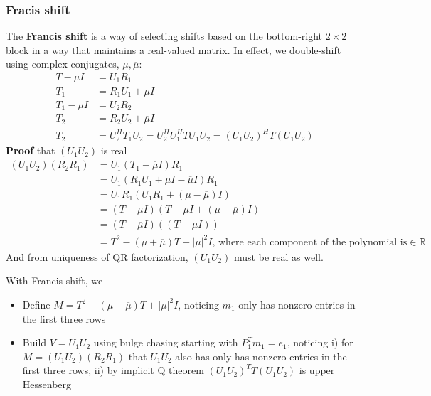 \documentclass{article}
\newcommand{\abs}[1]{\lvert#1\rvert}
\begin{document}
\subsubsection{Fracis shift}
The \textbf{Francis shift} is a way of selecting shifts based on the bottom-right $2\times 2$ block in a way that maintains a real-valued matrix. In effect, we double-shift using complex conjugates, $\mu, \overline{\mu}$:
\begin{align*}
    T - \mu I &= U_1R_1\\
    T_1 &= R_1U_1 + \mu I\\
    T_1 - \overline{\mu}I &= U_2R_2\\
    T_2 &= R_2U_2 + \overline{\mu}I\\
    T_2 &= U^H_2T_1U_2 = U^H_2U^H_1TU_1U_2 = (U_1U_2)^HT(U_1U_2)
\end{align*}
\textbf{Proof} that $(U_1U_2)$ is real
\begin{align*}
    (U_1U_2)(R_2R_1) &= U_1(T_1 - \overline{\mu}I)R_1\\
    &= U_1(R_1U_1 + \mu I - \overline{\mu}I)R_1\\
    &= U_1R_1(U_1R_1 + (\mu - \overline{\mu})I)\\
    &= (T - \mu I)(T - \mu I + (\mu - \overline{\mu})I)\\
    &= (T - \overline{\mu}I)((T - \mu I))\\
    &= T^2 - (\mu + \overline{\mu})T + \abs{\mu}^2I \textrm{, where each component of the polynomial is} \in \mathbb{R}
\end{align*}
And from uniqueness of QR factorization, $(U_1U_2)$ must be real as well.

With Francis shift, we 
\begin{itemize}
    \item Define $M = T^2 - (\mu + \overline{\mu})T + \abs{\mu}^2I$, noticing $m_1$ only has nonzero entries in the first three rows
    \item Build $V = U_1U_2$ using bulge chasing starting with $P_1^Tm_1 = e_1$, noticing i) for $M = (U_1U_2)(R_2R_1)$ that $U_1U_2$ also has only has nonzero entries in the first three rows, ii) by implicit Q theorem $(U_1U_2)^TT(U_1U_2)$ is upper Hessenberg
\end{itemize}
\end{document}

